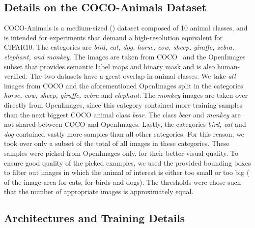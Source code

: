 \documentclass[10pt,twocolumn,letterpaper]{article}
\begin{document}
\subsection{Details on the COCO-Animals Dataset}

COCO-Animals is a medium-sized () dataset composed of 10 animal classes, and is intended for experiments that demand a high-resolution equivalent for \mbox{CIFAR10}.
The categories are \textit{bird, cat, dog, horse, cow, sheep, giraffe, zebra, elephant, and monkey}. The images are taken from COCO~\cite{Lin2014MicrosoftCC} and the OpenImages~\cite{OpenImages} subset that provides semantic label maps and binary mask and is also human-verified. The two datasets have a great overlap in animal classes. We take \textit{all} images from COCO and the aforementioned OpenImages split in the categories \textit{horse, cow, sheep, giraffe, zebra} and \textit{elephant}. The \textit{monkey} images are taken over directly from OpenImages, since this category contained more training samples than the next biggest COCO animal class \textit{bear}. The class \textit{bear} and \textit{monkey} are not shared between COCO and OpenImages. Lastly, the categories \textit{bird, cat} and \textit{dog} contained vastly more samples than all other categories. For this reason, we took over only a subset of the total of all images in these categories. These samples were picked from OpenImages only, for their better visual quality. To ensure good quality of the picked examples, we used the provided bounding boxes to filter out images in which the animal of interest is either too small or too big ( of the image area for cats,  for birds and dogs). The thresholds were chose such that the number of appropriate images is approximately equal. 




 \subsection{Architectures and Training Details}\label{sec:networks}
\end{document}
